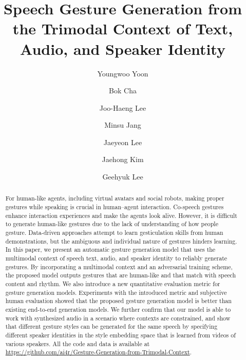 \documentclass[acmtog]{acmart}
\begin{document}
\title{Speech Gesture Generation from the Trimodal Context of Text, Audio, and Speaker Identity}

\author{Youngwoo Yoon}

\author{Bok Cha}

\author{Joo-Haeng Lee}

\author{Minsu Jang}

\author{Jaeyeon Lee}

\author{Jaehong Kim}

\author{Geehyuk Lee}



\begin{abstract}
For human-like agents, including virtual avatars and social robots, making proper gestures while speaking is crucial in human--agent interaction. Co-speech gestures enhance interaction experiences and make the agents look alive. However, it is difficult to generate human-like gestures due to the lack of understanding of how people gesture. Data-driven approaches attempt to learn gesticulation skills from human demonstrations, but the ambiguous and individual nature of gestures hinders learning. In this paper, we present an automatic gesture generation model that uses the multimodal context of speech text, audio, and speaker identity to reliably generate gestures. By incorporating a multimodal context and an adversarial training scheme, the proposed model outputs gestures that are human-like and that match with speech content and rhythm. We also introduce a new quantitative evaluation metric for gesture generation models. Experiments with the introduced metric and subjective human evaluation showed that the proposed gesture generation model is better than existing end-to-end generation models. We further confirm that our model is able to work with synthesized audio in a scenario where contexts are constrained, and show that different gesture styles can be generated for the same speech by specifying different speaker identities in the style embedding space that is learned from videos of various speakers. All the code and data is available at \url{https://github.com/ai4r/Gesture-Generation-from-Trimodal-Context}.
\end{abstract}
\end{document}
